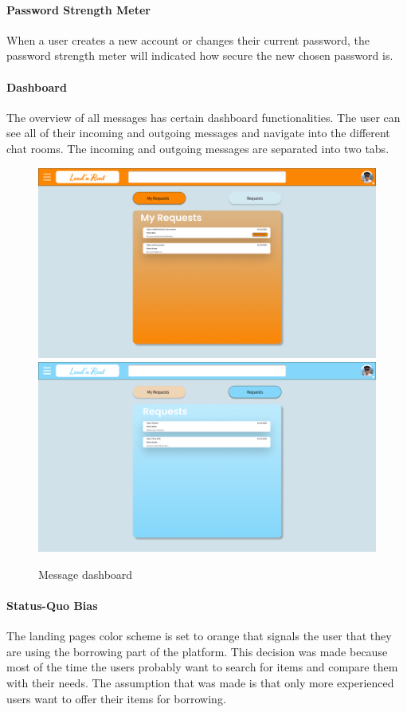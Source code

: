 	\paragraph{Password Strength Meter}
		When a user creates a new account or changes their current password, the password strength meter will indicated how secure the new chosen password is.
	\par
	
	\paragraph{Dashboard}
		The overview of all messages has certain dashboard functionalities. The user can see all of their incoming and outgoing messages and navigate into the different chat rooms. The incoming and outgoing messages are separated into two tabs.
		\begin{figure}[H]
			\centering
			\includegraphics[width=0.49\linewidth]{abb/3_design_guidelines/messages_1.png}
			\includegraphics[width=0.49\linewidth]{abb/3_design_guidelines/messages_2.png}
			\caption{Message dashboard}
			\label{fig:message_dashboard}
			\centering
		\end{figure}
	\par
	
	\paragraph{Status-Quo Bias}
		The landing pages color scheme is set to orange that signals the user that they are using the borrowing part of the platform. This decision was made because most of the time the users probably want to search for items and compare them with their needs. The assumption that was made is that only more experienced users want to offer their items for borrowing.
	\par
	
